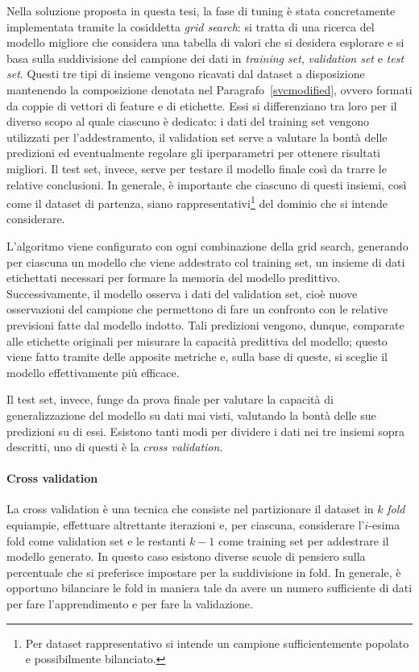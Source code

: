 \documentclass[12pt]{report}
\theoremstyle{definition}
\begin{document}
Nella soluzione proposta in questa tesi, la fase di tuning è stata concretamente implementata tramite la cosiddetta \textit{grid search}: si tratta di una ricerca del modello migliore che considera una tabella di valori che si desidera esplorare e si basa sulla suddivisione del campione dei dati in \textit{training set}, \textit{validation set} e \textit{test set}.
Questi tre tipi di insieme vengono ricavati dal dataset a disposizione mantenendo la composizione denotata nel Paragrafo~\ref{svcmodified}, ovvero formati da coppie di vettori di feature e di etichette. Essi si differenziano tra loro per il diverso scopo al quale ciascuno è dedicato: i dati del training set vengono utilizzati per l'addestramento, il validation set serve a valutare la bontà delle predizioni ed eventualmente regolare gli iperparametri per ottenere risultati migliori. Il test set, invece, serve per testare il modello finale così da trarre le relative conclusioni.
In generale, è importante che ciascuno di questi insiemi, così come il dataset di partenza, siano rappresentativi\footnote{Per dataset rappresentativo si intende un campione sufficientemente popolato e possibilmente bilanciato.} del dominio che si intende considerare.

L'algoritmo viene configurato con ogni combinazione della grid search, generando per ciascuna un modello che viene addestrato col training set, un insieme di dati etichettati necessari per formare la memoria del modello predittivo. Successivamente, il modello osserva i dati del validation set, cioè nuove osservazioni del campione che permettono di fare un confronto con le relative previsioni fatte dal modello indotto. Tali predizioni vengono, dunque, comparate alle etichette originali per misurare la capacità predittiva del modello; questo viene fatto tramite delle apposite metriche e, sulla base di queste, si sceglie il modello effettivamente più efficace.

Il test set, invece, funge da prova finale per valutare la capacità di generalizzazione del modello su dati mai visti, valutando la bontà delle sue predizioni su di essi.
Esistono tanti modi per dividere i dati nei tre insiemi sopra descritti, uno di questi è la \textit{cross validation}.


\paragraph{Cross validation} 
La cross validation è una tecnica che consiste nel partizionare il dataset in $k$ \textit{fold} equiampie, effettuare altrettante iterazioni e, per ciascuna, considerare l'$i$-esima fold come validation set e le restanti $k-1$ come training set per addestrare il modello generato.
In questo caso esistono diverse scuole di pensiero sulla percentuale che si preferisce impostare per la suddivisione in fold.
In generale, è opportuno bilanciare le fold in maniera tale da avere un numero sufficiente di dati per fare l'apprendimento e per fare la validazione.
\end{document}
